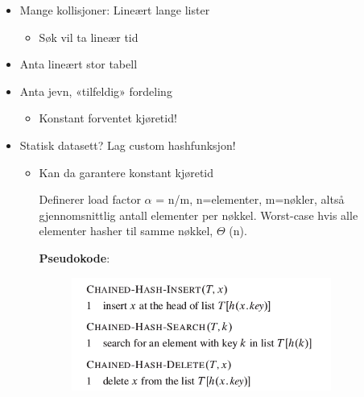 \documentclass[12pt]{report}
\begin{document}
\begin{itemize}
	\item Mange kollisjoner: Lineært lange lister \par

\begin{itemize}
	\item Søk vil ta lineær tid\par


\end{itemize}
	\item Anta lineært stor tabell\par

	\item Anta jevn, «tilfeldig» fordeling \par

\begin{itemize}
	\item Konstant forventet kjøretid!\par


\end{itemize}
	\item Statisk datasett?  Lag custom hashfunksjon!\par

\begin{itemize}
	\item Kan da garantere konstant kjøretid\par


\vspace{\baselineskip}
Definerer load factor $ \alpha $  = n/m, n=elementer, m=nøkler, altså gjennomsnittlig antall elementer per nøkkel. Worst-case hvis alle elementer hasher til samme nøkkel, $ \Theta $ (n).\par


\vspace{\baselineskip}
{\fontsize{13pt}{15.6pt}\selectfont \textbf{Pseudokode}: \par}\par




\begin{figure}[H]
	\begin{Center}
		\includegraphics[width=3.37in,height=1.46in]{./media/image20.png}
	\end{Center}
\end{figure}



\end{itemize}
\end{itemize}
\end{document}
